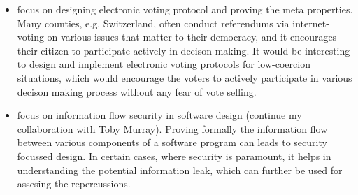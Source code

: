 \documentclass{article}
\begin{document}
\begin{itemize}
\item focus on designing electronic voting protocol and proving the meta properties. Many counties, e.g. Switzerland,
often conduct referendums via internet-voting on various issues that matter to their democracy, and 
it encourages their citizen to participate actively in decison making. It would be 
interesting to design and implement electronic voting protocols for low-coercion 
situations, which would  encourage the voters to actively participate in 
various decison making process without any fear of vote selling. 

\item focus on information flow security in software design (continue my collaboration with Toby Murray). 
Proving formally the information flow between various components of a software program can leads to 
security focussed design. In certain cases, where security is paramount,  
it helps in understanding the potential information leak, which can further be used 
for assesing the repercussions. 

\end{itemize}
\end{document}

